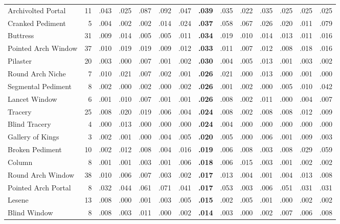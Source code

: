 \documentclass[lineno,pdflatex,sn-mathphys-num]{sn-jnl}%
\theoremstyle{thmstyleone}%
\theoremstyle{thmstyletwo}%
\theoremstyle{thmstylethree}%
\begin{document}
\begin{appendices}
\begin{table}[!htbp]
\begin{tabular}{@{}lrcccccccccccc@{}}
Archivolted Portal & 11 & .043 & .025 & .087 & .092 & .047 & \textbf{.039} & .035 & .022 & .035 & .025 & .025 & .025 \\
Cranked Pediment & 5 & .004 & .002 & .002 & .014 & .024 & \textbf{.037} & .058 & .067 & .026 & .020 & .011 & .079 \\
Buttress & 31 & .009 & .014 & .005 & .005 & .011 & \textbf{.034} & .019 & .010 & .014 & .013 & .011 & .016 \\
Pointed Arch Window & 37 & .010 & .019 & .019 & .009 & .012 & \textbf{.033} & .011 & .007 & .012 & .008 & .018 & .016 \\
Pilaster & 20 & .003 & .000 & .007 & .001 & .002 & \textbf{.030} & .004 & .005 & .013 & .001 & .003 & .002 \\
Round Arch Niche & 7 & .010 & .021 & .007 & .002 & .001 & \textbf{.026} & .021 & .000 & .013 & .000 & .001 & .000 \\
Segmental Pediment & 8 & .002 & .000 & .002 & .000 & .002 & \textbf{.026} & .001 & .002 & .000 & .005 & .010 & .042 \\
Lancet Window & 6 & .001 & .010 & .007 & .001 & .001 & \textbf{.026} & .008 & .002 & .011 & .000 & .004 & .007 \\
Tracery & 25 & .008 & .020 & .019 & .006 & .004 & \textbf{.024} & .008 & .002 & .008 & .008 & .012 & .009 \\
Blind Tracery & 4 & .000 & .013 & .000 & .000 & .000 & \textbf{.024} & .004 & .000 & .000 & .000 & .000 & .000 \\
Gallery of Kings & 3 & .002 & .001 & .000 & .004 & .005 & \textbf{.020} & .005 & .000 & .006 & .001 & .009 & .003 \\
Broken Pediment & 10 & .002 & .012 & .008 & .004 & .016 & \textbf{.019} & .006 & .008 & .003 & .008 & .029 & .059 \\
Column & 8 & .001 & .001 & .003 & .001 & .006 & \textbf{.018} & .006 & .015 & .003 & .001 & .002 & .002 \\
Round Arch Window & 38 & .010 & .006 & .007 & .003 & .002 & \textbf{.017} & .013 & .004 & .001 & .004 & .013 & .008 \\
Pointed Arch Portal & 8 & .032 & .044 & .061 & .071 & .041 & \textbf{.017} & .053 & .003 & .006 & .051 & .031 & .031 \\
Lesene & 13 & .008 & .000 & .001 & .003 & .005 & \textbf{.015} & .002 & .005 & .001 & .000 & .002 & .002 \\
Blind Window & 8 & .008 & .003 & .011 & .000 & .002 & \textbf{.014} & .003 & .000 & .002 & .007 & .006 & .008 \\

\end{tabular}
\end{table}
\end{appendices}
\end{document}
